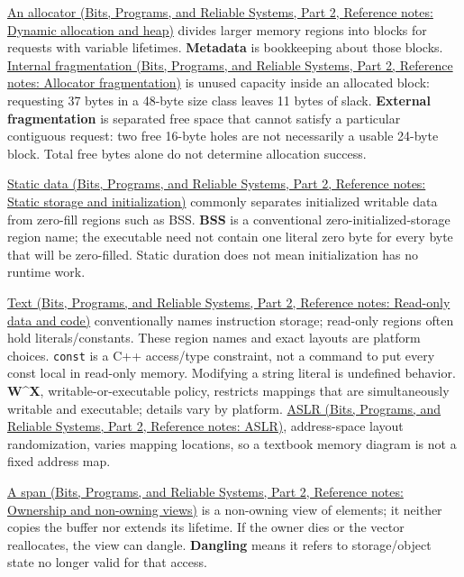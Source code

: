 \href{../01-Bits-Programs-and-Reliable-Systems-P02/main.pdf\#nameddest=appendix-c3480f7d9ff3}{An allocator (Bits, Programs, and Reliable Systems, Part 2, Reference notes: Dynamic allocation and heap)} divides larger memory regions into blocks for requests with variable lifetimes. \textbf{Metadata} is bookkeeping about those blocks. \href{../01-Bits-Programs-and-Reliable-Systems-P02/main.pdf\#nameddest=appendix-a7c50686d81f}{Internal fragmentation (Bits, Programs, and Reliable Systems, Part 2, Reference notes: Allocator fragmentation)} is unused capacity inside an allocated block: requesting 37 bytes in a 48-byte size class leaves 11 bytes of slack. \textbf{External fragmentation} is separated free space that cannot satisfy a particular contiguous request: two free 16-byte holes are not necessarily a usable 24-byte block. Total free bytes alone do not determine allocation success.

\href{../01-Bits-Programs-and-Reliable-Systems-P02/main.pdf\#nameddest=appendix-17c93c4c2f19}{Static data (Bits, Programs, and Reliable Systems, Part 2, Reference notes: Static storage and initialization)} commonly separates initialized writable data from zero-fill regions such as BSS. \textbf{BSS} is a conventional zero-initialized-storage region name; the executable need not contain one literal zero byte for every byte that will be zero-filled. Static duration does not mean initialization has no runtime work.

\href{../01-Bits-Programs-and-Reliable-Systems-P02/main.pdf\#nameddest=appendix-5f9e5e2f0a5e}{Text (Bits, Programs, and Reliable Systems, Part 2, Reference notes: Read-only data and code)} conventionally names instruction storage; read-only regions often hold literals/constants. These region names and exact layouts are platform choices. \texttt{const} is a C++ access/type constraint, not a command to put every const local in read-only memory. Modifying a string literal is undefined behavior. \textbf{W\^{}X}, writable-or-executable policy, restricts mappings that are simultaneously writable and executable; details vary by platform. \href{../01-Bits-Programs-and-Reliable-Systems-P02/main.pdf\#nameddest=appendix-78cb248c8355}{ASLR (Bits, Programs, and Reliable Systems, Part 2, Reference notes: ASLR)}, address-space layout randomization, varies mapping locations, so a textbook memory diagram is not a fixed address map.

\href{../01-Bits-Programs-and-Reliable-Systems-P02/main.pdf\#nameddest=appendix-d52e4486f527}{A span (Bits, Programs, and Reliable Systems, Part 2, Reference notes: Ownership and non-owning views)} is a non-owning view of elements; it neither copies the buffer nor extends its lifetime. If the owner dies or the vector reallocates, the view can dangle. \textbf{Dangling} means it refers to storage/object state no longer valid for that access.

